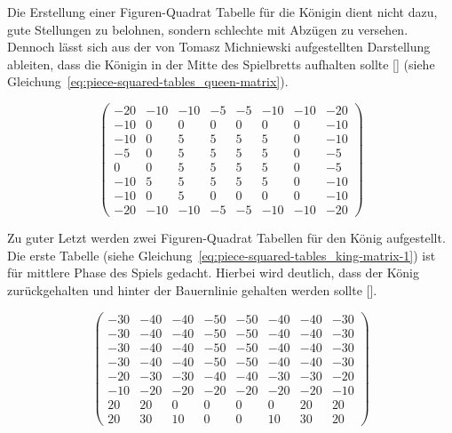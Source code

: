 \bigskip

\noindent Die Erstellung einer Figuren-Quadrat Tabelle für die Königin dient nicht dazu, gute Stellungen zu belohnen, sondern schlechte mit Abzügen zu versehen.
Dennoch lässt sich aus der von Tomasz Michniewski aufgestellten Darstellung ableiten, dass die Königin in der Mitte des Spielbretts aufhalten sollte [\cite{Wiki2018}] (siehe Gleichung~\ref{eq:piece-squared-tables_queen-matrix}).

\begin{equation} \label{eq:piece-squared-tables_queen-matrix}
\begin{pmatrix}
-20 & -10 & -10 & -5 & -5 & -10 & -10 & -20 \\
-10 & 0 & 0 & 0 & 0 & 0 & 0 & -10 \\
-10 & 0 & 5 & 5 & 5 & 5 & 0 & -10 \\
-5 & 0 & 5 & 5 & 5 & 5 & 0 & -5 \\
0 & 0 & 5 & 5 & 5 & 5 & 0 & -5 \\
-10 & 5 & 5 & 5 & 5 & 5 & 0 & -10 \\
-10 & 0 & 5 & 0 & 0 & 0 & 0 & -10 \\
-20 & -10 & -10 & -5 & -5 & -10 & -10 & -20
\end{pmatrix}
\end{equation}

\bigskip

\noindent Zu guter Letzt werden zwei Figuren-Quadrat Tabellen für den König aufgestellt.
Die erste Tabelle (siehe Gleichung~\ref{eq:piece-squared-tables_king-matrix-1}) ist für mittlere Phase des Spiels gedacht.
Hierbei wird deutlich, dass der König zurückgehalten und hinter der Bauernlinie gehalten werden sollte [\cite{Wiki2018}].

\begin{equation} \label{eq:piece-squared-tables_king-matrix-1}
\begin{pmatrix}
-30 & -40 & -40 & -50 & -50 & -40 & -40 & -30 \\
-30 & -40 & -40 & -50 & -50 & -40 & -40 & -30 \\
-30 & -40 & -40 & -50 & -50 & -40 & -40 & -30 \\
-30 & -40 & -40 & -50 & -50 & -40 & -40 & -30 \\
-20 & -30 & -30 & -40 & -40 & -30 & -30 & -20 \\
-10 & -20 & -20 & -20 & -20 & -20 & -20 & -10 \\
20 & 20 & 0 & 0 & 0 & 0 & 20 & 20 \\
20 & 30 & 10 & 0 & 0 & 10 & 30 & 20
\end{pmatrix}
\end{equation}

